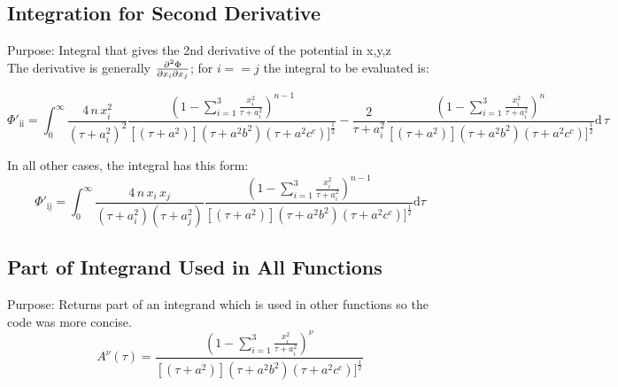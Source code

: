 \documentclass[a4paper,11pt]{article}
\begin{document}
			
	
		
		\subsection{Integration for Second Derivative}
			Purpose: Integral that gives the 2nd derivative of the potential in x,y,z \\
			
			\noindent The derivative is generally $ \pdv{\Phi}{x_i}{x_j} $; for $ i==j $ the integral to be evaluated is: 
			
		\begin{equation}
		\Phi'_{\mathrm{ii}} = \int_{0}^{\infty} 
		 \frac{4\,n\,x_i^2}{(\tau + a_i^2)^2} \frac{\left(1- \sum_{i=1}^{3} \frac{x_i^2}{\tau + a_i^2}\right)^{n-1}}{[(\tau + a^2)](\tau + a^2b^2)(\tau + a^2c^c)]^\frac{1}{2}}
		- \frac{2}{\tau + a_i^2} \frac{\left(1- \sum_{i=1}^{3} \frac{x_i^2}{\tau + a_i^2}\right)^{n}}{[(\tau + a^2)](\tau + a^2b^2)(\tau + a^2c^c)]^\frac{1}{2}} \mathrm{d}\,\tau
		\end{equation}
		
			\noindent In all other cases, the integral has this form:
		\begin{equation}
		\Phi'_{\mathrm{ij}} = \int_{0}^{\infty} 
		\frac{4\,n\,x_i\,x_j}{(\tau + a_i^2)(\tau + a_j^2)} \frac{\left(1- \sum_{i=1}^{3} \frac{x_i^2}{\tau + a_i^2}\right)^{n-1}}{[(\tau + a^2)](\tau + a^2b^2)(\tau + a^2c^c)]^\frac{1}{2}} \mathrm{d}\tau
		\end{equation}	
			
			
		
	
		\subsection{Part of Integrand Used in All Functions}
			Purpose: Returns part of an integrand which is used in other functions so the code was more concise. \\
		\begin{equation}
		A^{\nu}(\tau) = \frac{\left(1- \sum_{i=1}^{3} \frac{x_i^2}{\tau + a_i^2}\right)^{\nu}}{[(\tau + a^2)](\tau + a^2b^2)(\tau + a^2c^c)]^\frac{1}{2}}
		\end{equation}
			
	
	
	
\end{document}
